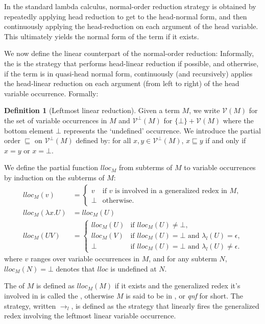 \documentclass{article}
\theoremstyle{definition}
\newtheorem{definition}{Definition}[section]
\newcommand\VarSet{\mathcal{V}}
\begin{document}
In the standard lambda calculus, normal-order reduction strategy is obtained by repeatedly applying head reduction to get to the head-normal form, and then continuously applying the head-reduction on each argument of the head variable.
This ultimately yields the normal form of the term if it exists.

We now define the linear counterpart of the normal-order reduction: Informally, the  is the strategy that performs head-linear reduction if possible, and otherwise, if the term is in quasi-head normal form, continuously (and recursively) applies the head-linear reduction on each argument (from left to right) of the head variable occurrence.
Formally:

\begin{definition}[Leftmost linear reduction]
Given a term $M$, we write $\VarSet(M)$ for the set of variable occurrences in $M$
and $\VarSet^\bot(M)$ for $\{\bot \} + \VarSet(M)$ where the bottom element $\bot$ represents the `undefined' occurrence. We introduce the partial order $\sqsubseteq$ on $\VarSet^\bot(M)$ defined by: for all $x,y \in \VarSet^\bot(M)$, $x \sqsubseteq y$ if and only if $x = y$ or $x = \bot$.

We define the partial function $lloc_M$ from subterms of $M$ to variable occurrences by induction on the subterms of $M$:
\begin{align*}
lloc_M(v) &=
    \begin{cases}
    v &\mbox{if $v$ is involved in a generalized redex in $M$,} \\
    \bot & \mbox {otherwise.}
    \end{cases}  \\
lloc_M(\lambda x . U) &= lloc_M(U) \\
lloc_M(U V) &= \begin{cases}
                lloc_M(U) &\mbox{if $lloc_M(U)\neq\bot$,} \\
                lloc_M(V) &\mbox{if $lloc_M(U)=\bot$ and $\lambda_l(U) = \epsilon$,} \\
                \bot & \mbox{if $lloc_M(U)=\bot$ and $\lambda_l(U) \neq \epsilon$.}
              \end{cases}
\end{align*}
where $v$ ranges over variable occurrences in $M$,
and for any subterm $N$, $lloc_M(N) = \bot$ denotes that $lloc$ is undefined at $N$.

The  of $M$
is defined as $lloc_M(M)$ if it exists and the generalized redex it's involved in is called the , otherwise $M$ is said to be in , or \emph{qnf} for short.
The  strategy, written $\rightarrow_l$, is defined as the strategy that linearly fires the generalized redex involving the leftmost linear variable occurrence.
\end{definition}
\end{document}
